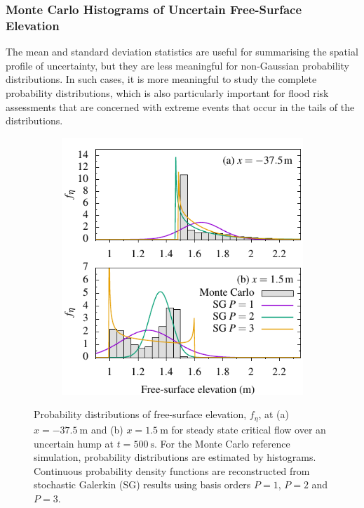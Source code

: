 \subsubsection{Monte Carlo Histograms of Uncertain Free-Surface Elevation}
The mean and standard deviation statistics are useful for summarising the spatial profile of uncertainty, but they are less meaningful for non-Gaussian probability distributions.
In such cases, it is more meaningful to study the complete probability distributions, which is also particularly important for flood risk assessments that are concerned with extreme events that occur in the tails of the distributions.

\begin{figure}
    \centering
    \begin{subfigure}{\textwidth}
    \label{fig:criticalSteadyState-pdf:upstream}
    \label{fig:criticalSteadyState-pdf:downstream}
    \centering
    \includegraphics{fig-criticalSteadyState-pdf.pdf}
    \end{subfigure}
    \caption{Probability distributions of free-surface elevation, $f_\eta$, at (a) $x = \SI{-37.5}{\meter}$ and (b) $x = \SI{1.5}{\meter}$ for steady state critical flow over an uncertain hump at $t = \SI{500}{\second}$.
    For the Monte Carlo reference simulation, probability distributions are estimated by histograms.
    Continuous probability density functions are reconstructed from stochastic Galerkin (SG) results using basis orders $P=1$, $P=2$ and $P=3$.}
    \label{fig:criticalSteadyState-pdf}
\end{figure}

